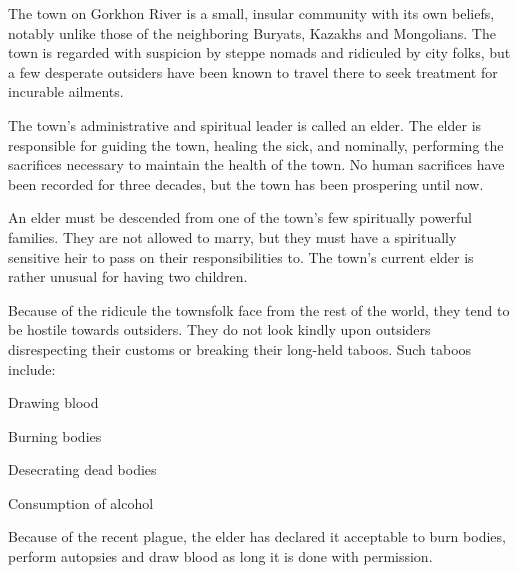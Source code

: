 \documentclass[blue]{Pestilence}
\begin{document}
\name{\bTownElders{}}

The town on Gorkhon River is a small, insular community with its own beliefs, notably unlike those of the neighboring Buryats, Kazakhs and Mongolians. The town is regarded with suspicion by steppe nomads and ridiculed by city folks, but a few desperate outsiders have been known to travel there to seek treatment for incurable ailments.

The town's administrative and spiritual leader is called an elder. The elder is responsible for guiding the town, healing the sick, and nominally, performing the sacrifices necessary to maintain the health of the town. No human sacrifices have been recorded for three decades, but the town has been prospering until now.

An elder must be descended from one of the town's few spiritually powerful families. They are not allowed to marry, but they must have a spiritually sensitive heir to pass on their responsibilities to. The town's current elder is rather unusual for having two children. 

Because of the ridicule the townsfolk face from the rest of the world, they tend to be hostile towards outsiders. They do not look kindly upon outsiders disrespecting their customs or breaking their long-held taboos. Such taboos include:

\begin{itemz}
	\item Drawing blood
	\item Burning bodies
	\item Desecrating dead bodies
	\item Consumption of alcohol
\end{itemz}

Because of the recent plague, the elder has declared it acceptable to burn bodies, perform autopsies and draw blood as long it is done with \cElder{\their} permission.
\end{document}
